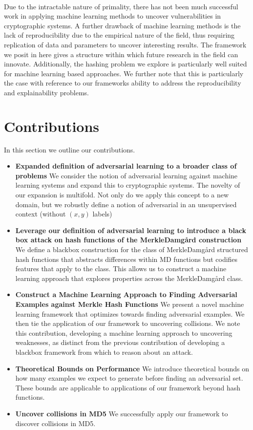 \documentclass[letterpaper,twocolumn,10pt]{article}
\begin{document}
\\
Due to the intractable nature of primality, there has not been much successful work in applying machine learning methods to uncover vulnerabilities in cryptographic systems. A further drawback of machine learning methods is the lack of reproducibility due to the empirical nature of the field, thus requiring replication of data and parameters to uncover interesting results. The framework we posit in here gives a structure within which future research in the field can innovate.  Additionally, the hashing problem we explore is particularly well suited for machine learning based approaches. We further note that this is particularly the case with reference to our frameworks ability to address the reproducibility and explainability problems. 

\section{Contributions}
In this section we outline our contributions. 

\begin{itemize}
\item \textbf{Expanded definition of adversarial learning to a broader class of problems} We consider the notion of adversarial learning against machine learning systems and expand this to cryptographic systems. The novelty of our expansion is multifold. Not only do we apply this concept to a new domain, but we robustly define a notion of adversarial in an unsupervised context (without $(x,y)$ labels) 
\item \textbf{Leverage our definition of adversarial learning to introduce a black box attack on hash functions of the Merkle{\textendash}Damg\r{a}rd construction} We define a blackbox construction for the class of Merkle{\textendash}Damg\r{a}rd structured hash functions that abstracts differences within MD functions but codifies features that apply to the class. This allows us to construct a machine learning approach that explores properties across the Merkle{\textendash}Damg\r{a}rd class. 
\item \textbf{Construct a Machine Learning Approach to Finding Adversarial Examples against Merkle Hash Functions} We present a novel machine learning framework that optimizes towards finding adversarial examples. We then tie the application of our framework to uncovering collisions. We note this contribution, developing a machine learning approach to uncovering weaknesses, as distinct from the previous contribution of developing a blackbox framework from which to reason about an attack.
\item \textbf{Theoretical Bounds on Performance} We introduce theoretical bounds on how many examples we expect to generate before finding an adversarial set. These bounds are applicable to applications of our framework beyond hash functions. 
\item \textbf{Uncover collisions in MD5} We successfully apply our framework to discover collisions in MD5. 
\end{itemize}
\end{document}
